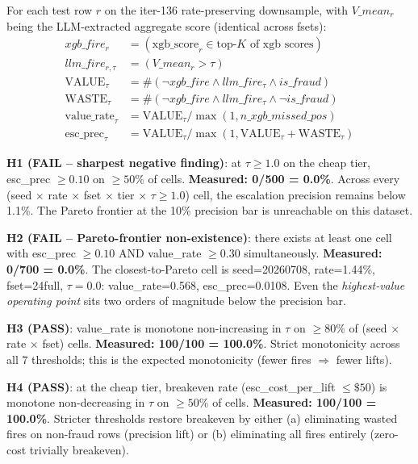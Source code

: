 \documentclass{article}
\begin{document}
For each test row $r$ on the iter-136 rate-preserving downsample, with
$V\_mean_r$ being the LLM-extracted aggregate score (identical across
fsets):
\begin{align*}
xgb\_fire_r &= (\text{xgb\_score}_r \in \text{top-}K\text{ of xgb scores}) \\
llm\_fire_{r,\tau} &= (V\_mean_r > \tau) \\
\text{VALUE}_\tau &= \#(\neg xgb\_fire \wedge llm\_fire_{\tau} \wedge is\_fraud) \\
\text{WASTE}_\tau &= \#(\neg xgb\_fire \wedge llm\_fire_{\tau} \wedge \neg is\_fraud) \\
\text{value\_rate}_\tau &= \text{VALUE}_\tau / \max(1, n\_xgb\_missed\_pos) \\
\text{esc\_prec}_\tau &= \text{VALUE}_\tau / \max(1, \text{VALUE}_\tau + \text{WASTE}_\tau)
\end{align*}

\textbf{H1 (FAIL -- sharpest negative finding)}: at $\tau \geq 1.0$ on
the cheap tier, esc\_prec $\geq 0.10$ on $\geq 50\%$ of cells.
\textbf{Measured: 0/500 = 0.0\%}. Across every (seed $\times$ rate
$\times$ fset $\times$ tier $\times$ $\tau \geq 1.0$) cell, the
escalation precision remains below 1.1\%. The Pareto frontier at the
10\% precision bar is unreachable on this dataset.

\textbf{H2 (FAIL -- Pareto-frontier non-existence)}: there exists at
least one cell with esc\_prec $\geq 0.10$ AND value\_rate $\geq 0.30$
simultaneously. \textbf{Measured: 0/700 = 0.0\%}. The closest-to-Pareto
cell is seed=20260708, rate=1.44\%, fset=24full, $\tau=0.0$:
value\_rate=0.568, esc\_prec=0.0108. Even the \emph{highest-value
operating point} sits two orders of magnitude below the precision bar.

\textbf{H3 (PASS)}: value\_rate is monotone non-increasing in $\tau$ on
$\geq 80\%$ of (seed $\times$ rate $\times$ fset) cells. \textbf{Measured:
100/100 = 100.0\%}. Strict monotonicity across all 7 thresholds; this is
the expected monotonicity (fewer fires $\Rightarrow$ fewer lifts).

\textbf{H4 (PASS)}: at the cheap tier, breakeven rate (esc\_cost\_per\_lift
$\leq \$50$) is monotone non-decreasing in $\tau$ on $\geq 50\%$ of
cells. \textbf{Measured: 100/100 = 100.0\%}. Stricter thresholds restore
breakeven by either (a) eliminating wasted fires on non-fraud rows
(precision lift) or (b) eliminating all fires entirely (zero-cost
trivially breakeven).
\end{document}
